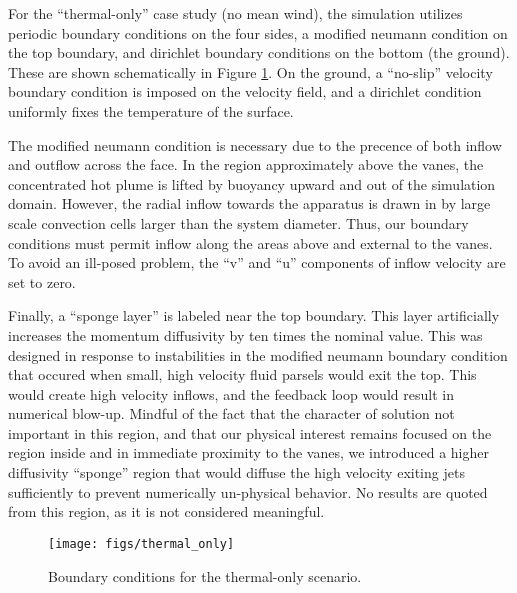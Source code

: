 %
%

For the ``thermal-only'' case study (no mean wind), the simulation
utilizes periodic boundary conditions on the four sides, a modified
neumann condition on the top boundary, and dirichlet boundary conditions
on the bottom (the ground). These are shown schematically in Figure
\ref{fig:thermalbc}. On the ground, a ``no-slip'' velocity boundary
condition is imposed on the velocity field, and a dirichlet condition
uniformly fixes the temperature of the surface. 

The modified neumann condition is necessary due to the precence of both
inflow and outflow across the face. In the region approximately above
the vanes, the concentrated hot plume is lifted by buoyancy
upward and out of the simulation domain. However, the radial inflow
towards the apparatus is drawn in by large scale convection cells larger
than the system diameter. Thus, our boundary conditions must permit
inflow along the areas above and external to the vanes. To avoid an
ill-posed problem, the ``v'' and ``u'' components of inflow velocity are
set to zero.  

Finally, a ``sponge layer'' is labeled near the top boundary. This layer
artificially increases the momentum diffusivity by ten times the nominal
value. This was designed in response to instabilities in the modified
neumann boundary condition that occured when small, high velocity fluid
parsels would exit the top. This would create high velocity inflows, and
the feedback loop would result in numerical blow-up. Mindful of the fact
that the character of solution not important in this region, and that
our physical interest remains focused on the region inside and
in immediate proximity to the vanes, we introduced a higher diffusivity
``sponge'' region that would diffuse the high velocity exiting jets
sufficiently to prevent numerically un-physical behavior. No results are
quoted from this region, as it is not considered meaningful. 

\begin{figure}[!htb]
  \begin{center}
    \texttt{[image: figs/thermal\_only]}
    \caption{Boundary conditions for the thermal-only scenario. }
    \label{fig:thermalbc}
  \end{center}
\end{figure}

